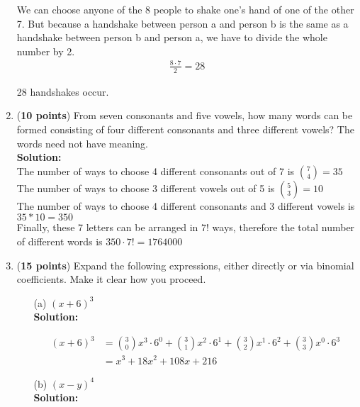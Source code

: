 \documentclass[a4paper]{article}
\begin{document}
\begin{enumerate}
We can choose anyone of the 8 people to shake one's hand of one of the other 7. But because a handshake between person a and person b is the same as a handshake between person b and person a, we have to divide the whole number by 2.\\

	
\begin{align*}
	\frac{8 \cdot 7}{2} = 28
\end{align*}	
	
28 handshakes occur.\\	
	
	
\item (\textbf{10 points}) From seven consonants and five vowels, how many words can be formed consisting of four different consonants and three different vowels? The words need not have meaning.\\
\textbf{Solution:}\\
	
The number of ways to choose 4 different consonants out of 7 is ${7 \choose 4} = 35$\\

The number of ways to choose 3 different vowels out of 5 is ${5 \choose 3} = 10$\\

The number of ways to choose 4 different consonants and 3 different vowels is $35 * 10 = 350$\\

Finally, these 7 letters can be arranged in $7!$ ways, therefore the total number of different words is $350 \cdot 7! = 1764000$\\	
	
	
	
\item (\textbf{15 points}) Expand the following expressions, either directly or via binomial coefficients. Make it clear how you proceed.

\begin{enumerate}
	\item[(a)] $(x+6)^3$\\
	\textbf{Solution:}
	
	\begin{align*}
	(x+6)^3 &= {3 \choose 0}x^3 \cdot 6^0 + {3 \choose 1}x^2 \cdot 6^1 + {3 \choose 2}x^1 \cdot 6^2 + {3 \choose 3}x^0 \cdot 6^3\\
	&= x^3 + 18x^2 + 108x + 216
	\end{align*}
	
	\item[(b)] $(x-y)^4$\\
	\textbf{Solution:}\\
	

\end{enumerate}
\end{enumerate}
\end{document}
